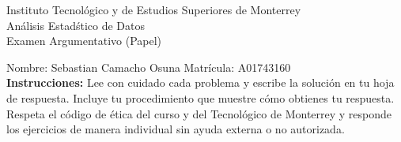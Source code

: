 \documentclass[10pt]{report}
\begin{document}
\newpage



\begin{center}
{\large Instituto Tecnol\'{o}gico y de Estudios Superiores de Monterrey \\
An\'alisis Estad\'stico de Datos } \\
Examen Argumentativo (Papel)
\end{center}

Nombre: \underline{\hspace*{.2in}}
Sebastian Camacho Osuna
\underline{\hspace*{.2in}} \quad Matr\'icula:\underline{\hspace*{.2in}}
A01743160
\underline{\hspace*{.2in}} \\

{\bf Instrucciones:} Lee con cuidado cada problema y escribe la soluci\'on
en tu hoja de respuesta. Incluye tu procedimiento que muestre c\'omo obtienes tu respuesta.  Respeta el c\'odigo de \'etica del curso y del Tecnol\'ogico de Monterrey y responde los ejercicios de manera individual sin ayuda externa o no autorizada.
\end{document}
